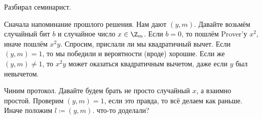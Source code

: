 	Разбирал семинарист.

	Сначала напоминание прошлого решения.
	Нам дают $(y, m)$.
	Давайте возьмём случайный бит $b$ и случайное число $x \in \Z_m$.
	Если $b=0$, то пошлём Prover'у $x^2$, иначе пошлём $x^2y$.
	Спросим, прислали ли мы квадратичный вычет.
	Если $(y, m) = 1$, то мы победили и вероятности (вроде) хорошие.
	Если же $(y, m) \neq 1$, то $x^2y$ может оказаться квадратичным вычетом, даже если $y$ был невычетом.

	Чиним протокол.
	Давайте будем брать не просто случайный $x$, а взаимно простой.
	Проверим $(y, m)=1$, если это правда, то всё делаем как раньше.
	Иначе положим $l\coloneq (y, m)$.
	\TODO что-то доделали?
